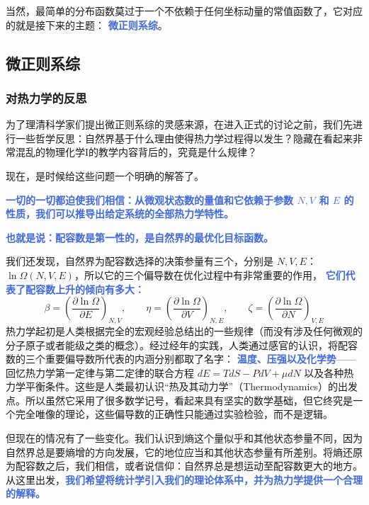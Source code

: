 \documentclass[hyperref,UTF-8]{ctexart}
\newcommand{\0}{\boldsymbol{0}}
\begin{document}
当然，最简单的分布函数莫过于一个不依赖于任何坐标动量的常值函数了，它对应的就是接下来的主题： \textcolor{RoyalBlue}{\textbf{\kaishu 微正则系综}}。



\subsection{微正则系综}

\subsubsection{对热力学的反思}

为了理清科学家们提出微正则系综的灵感来源，在进入正式的讨论之前，我们先进行一些哲学反思：自然界基于什么理由使得热力学过程得以发生？隐藏在看起来非常混乱的物理化学I的教学内容背后的，究竟是什么规律？

现在，是时候给这些问题一个明确的解答了。

\textcolor{RoyalBlue}{\textbf{\kaishu 一切的一切都迫使我们相信：从微观状态数的量值和它依赖于参数 $N,V$ 和 $E$ 的性质，我们可以推导出给定系统的全部热力学特性。}}

\textcolor{RoyalBlue}{\textbf{\kaishu 也就是说：配容数是第一性的，是自然界的最优化目标函数。}}

我们还发现，自然界为配容数选择的决策参量有三个，分别是 $N,V,E$：$\ln\Omega(N,V,E)$，所以它的三个偏导数在优化过程中有非常重要的作用， \textcolor{RoyalBlue}{\textbf{\kaishu 它们代表了配容数上升的倾向有多大：}} 
\begin{equation}
    \beta = \left(\frac{\partial \ln\Omega}{\partial E}\right)_{N,V},\quad\quad \eta = \left(\frac{\partial \ln\Omega}{\partial V}\right)_{N,E},\quad\quad \zeta = \left(\frac{\partial \ln\Omega}{\partial N}\right)_{V,E}
\end{equation}
热力学起初是人类根据完全的宏观经验总结出的一些规律（而没有涉及任何微观的分子原子或者能级之类的概念）。经过经年的实践，人类通过感官的认识，将配容数的三个重要偏导数所代表的内涵分别都取了名字： \textcolor{RoyalBlue}{\textbf{\kaishu 温度、压强以及化学势}}——回忆热力学第一定律与第二定律的联合方程 $dE = TdS - PdV+ \mu dN$ 以及各种热力学平衡条件。这些是人类最初认识“热及其动力学”（Thermodynamics）的出发点。所以虽然它采用了很多数学记号，看起来具有坚实的数学基础，但它终究是一个完全唯像的理论，这些偏导数的正确性只能通过实验检验，而不是逻辑。

但现在的情况有了一些变化。我们认识到熵这个量似乎和其他状态参量不同，因为自然界总是要熵增的方向发展，它的地位应当和其他状态参量有所差别。将熵还原为配容数之后，我们相信，或者说信仰：自然界总是想运动至配容数更大的地方。从这里出发，\textcolor{RoyalBlue}{\textbf{\kaishu 我们希望将统计学引入我们的理论体系中，并为热力学提供一个合理的解释。}} 
\end{document}
